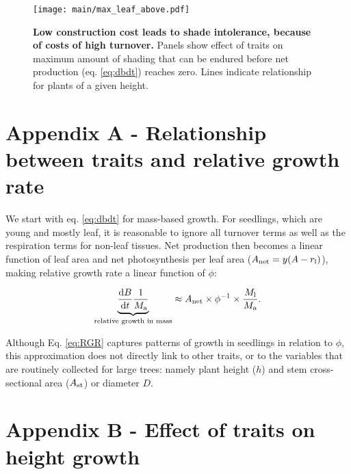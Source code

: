 \documentclass[a4paper,11pt]{article}
\begin{document}
\newpage

\begin{figure}[ht]
\centering
\texttt{[image: main/max\_leaf\_above.pdf]}
\caption{\textbf{Low construction cost leads to shade intolerance,
because of costs of high turnover.} Panels show effect of traits on
maximum amount of shading that can be endured before net production (eq.
\ref{eq:dbdt}) reaches zero. Lines indicate relationship for plants of a
given height. \label{fig:wplcp}}
\end{figure}

\clearpage

\section{Appendix A - Relationship between traits and relative growth rate} \label{app:traits-RGR}

We start with eq. \ref{eq:dbdt} for mass-based growth. For seedlings, which are
young and mostly leaf, it is reasonable to ignore all turnover terms as
well as the respiration terms for non-leaf tissues. Net production then
becomes a linear function of leaf area and net photosynthesis per leaf
area ($A_\textrm{net} = y(A - r_{\rm l})$), making relative growth
rate a linear function of $\phi$:

\begin{equation}\label{eq:RGR}
\underbrace{\strut\frac{{\rm d}B}{{\rm d}t}\frac{1}{M_{\rm a}}}_\textrm{relative growth in mass}  \approx A_\textrm{net} \times \phi^{-1} \times \frac{M_{\rm l}}{M_{\rm a}}. \end{equation}

Although Eq. \ref{eq:RGR} captures patterns of growth in seedlings in
relation to $\phi$\citep{Wright-2000}, this
approximation does not directly link to other traits, or to the
variables that are routinely collected for large trees: namely plant
height ($h$) and stem cross-sectional area ($A_{\rm st}$) or
diameter $D$.

\section{Appendix B - Effect of traits on height growth} \label{app:traits-RGR}
\end{document}
